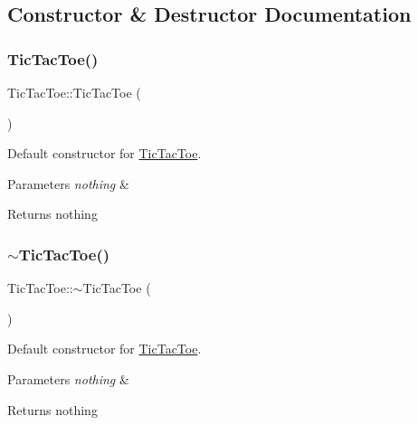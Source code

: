 \subsection{Constructor \& Destructor Documentation}
\mbox{\label{classTicTacToe_a103fe9a5ae41b5ef756e20594a70cb7a}} 
\subsubsection{\texorpdfstring{Tic\+Tac\+Toe()}{TicTacToe()}}
{\footnotesize\ttfamily Tic\+Tac\+Toe\+::\+Tic\+Tac\+Toe (\begin{DoxyParamCaption}{ }\end{DoxyParamCaption})\hspace{0.3cm}{\ttfamily [inline]}}



Default constructor for \mbox{\hyperlink{classTicTacToe}{Tic\+Tac\+Toe}}. 


\begin{DoxyParams}{Parameters}
{\em nothing} & \\
\hline
\end{DoxyParams}
\begin{DoxyReturn}{Returns}
nothing 
\end{DoxyReturn}
\mbox{\label{classTicTacToe_a5e9c4ed3279034d5530cc7b94a3e10e5}} 
\subsubsection{\texorpdfstring{$\sim$\+Tic\+Tac\+Toe()}{~TicTacToe()}}
{\footnotesize\ttfamily Tic\+Tac\+Toe\+::$\sim$\+Tic\+Tac\+Toe (\begin{DoxyParamCaption}{ }\end{DoxyParamCaption})\hspace{0.3cm}{\ttfamily [virtual]}}



Default constructor for \mbox{\hyperlink{classTicTacToe}{Tic\+Tac\+Toe}}. 


\begin{DoxyParams}{Parameters}
{\em nothing} & \\
\hline
\end{DoxyParams}
\begin{DoxyReturn}{Returns}
nothing 
\end{DoxyReturn}



